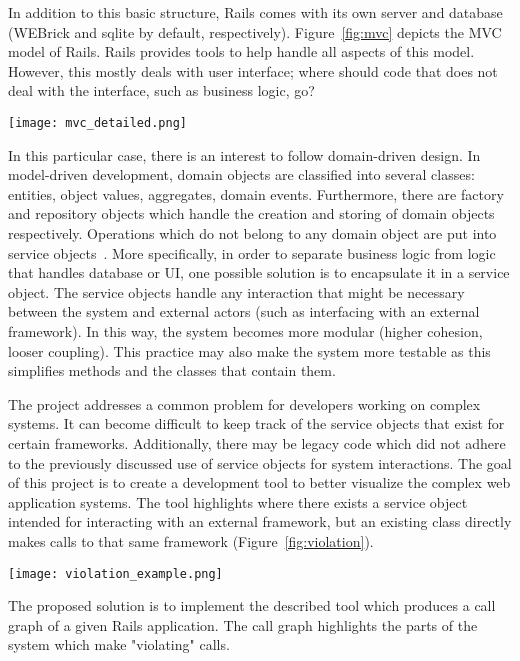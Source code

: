 In addition to this basic structure, Rails comes with its own server and database (WEBrick and sqlite by default, respectively). Figure~\ref{fig:mvc} depicts the MVC model of Rails. Rails provides tools to help handle all aspects of this model. However, this mostly deals with user interface; where should code that does not deal with the interface, such as business logic, go? 
\begin{center}
    \texttt{[image: mvc\_detailed.png]}
    \label{fig:mvc}
\end{center}
In this particular case, there is an interest to follow domain-driven design. In model-driven development, domain objects are classified into several classes: entities, object values, aggregates, domain events. Furthermore, there are factory and repository objects which handle the creation and storing of domain objects respectively. Operations which do not belong to any domain object are put into service objects~\cite{ddd-source}. More specifically, in order to separate business logic from logic that handles database or UI, one possible solution is to encapsulate it in a service object. The service objects handle any interaction that might be necessary between the system and external actors (such as interfacing with an external framework). In this way, the system becomes more modular (higher cohesion, looser coupling). This practice may also make the system more testable as this simplifies methods and the classes that contain them. 

The project addresses a common problem for developers working on complex systems. It can become difficult to keep track of the service objects that exist for certain frameworks. Additionally, there may be legacy code which did not adhere to the previously discussed use of service objects for system interactions. The goal of this project is to create a development tool to better visualize the complex web application systems. The tool highlights where there exists a service object intended for interacting with an external framework, but an existing class directly makes calls to that same framework (Figure~\ref{fig:violation}).
\begin{center}
    \texttt{[image: violation\_example.png]}
    \label{fig:violation}
\end{center}

The proposed solution is to implement the described tool which produces a call graph of a given Rails application. The call graph highlights the parts of the system which make "violating" calls. 

